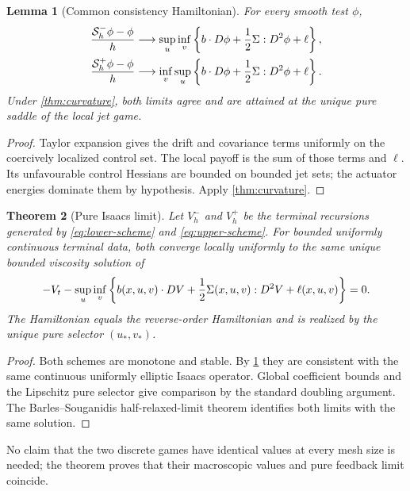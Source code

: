 \documentclass[11pt,reqno]{amsart}
\newtheorem{theorem}{Theorem}[section]
\newtheorem{lemma}[theorem]{Lemma}
\theoremstyle{definition}
\theoremstyle{remark}
\begin{document}
\begin{lemma}[Common consistency Hamiltonian]\label{lem:consistency}
For every smooth test $\phi$,
\begin{align*}
 {\mathcal S_h^-\phi-\phi\over h}&\longrightarrow
 \sup_u\inf_v\left\{
 b\cdot D\phi+{1\over2}\Sigma:D^2\phi+\ell\right\},\\
 {\mathcal S_h^+\phi-\phi\over h}&\longrightarrow
 \inf_v\sup_u\left\{
 b\cdot D\phi+{1\over2}\Sigma:D^2\phi+\ell\right\}.
\end{align*}
Under \cref{thm:curvature}, both limits agree and are attained at the unique
pure saddle of the local jet game.
\end{lemma}

\begin{proof}
Taylor expansion gives the drift and covariance terms uniformly on the
coercively localized control set.  The local payoff is the sum of those terms
and $\ell$.  Its unfavourable control Hessians are bounded on bounded jet sets;
the actuator energies dominate them by hypothesis.  Apply
\cref{thm:curvature}.
\end{proof}

\begin{theorem}[Pure Isaacs limit]\label{thm:scheme}
Let $V_h^-$ and $V_h^+$ be the terminal recursions generated by
\eqref{eq:lower-scheme} and \eqref{eq:upper-scheme}.  For bounded uniformly
continuous terminal data, both converge locally uniformly to the same unique
bounded viscosity solution of
\begin{equation}\label{eq:Isaacs}
 -V_t-\sup_u\inf_v\left\{
 b(x,u,v)\cdot DV+{1\over2}\Sigma(x,u,v):D^2V+\ell(x,u,v)
 \right\}=0.
\end{equation}
The Hamiltonian equals the reverse-order Hamiltonian and is realized by the
unique pure selector $(u_*,v_*)$.
\end{theorem}

\begin{proof}
Both schemes are monotone and stable.  By \cref{lem:consistency} they are
consistent with the same continuous uniformly elliptic Isaacs operator.
Global coefficient bounds and the Lipschitz pure selector give comparison by
the standard doubling argument.  The Barles--Souganidis half-relaxed-limit
theorem identifies both limits with the same solution.
\end{proof}

No claim that the two discrete games have identical values at every mesh size
is needed; the theorem proves that their macroscopic values and pure feedback
limit coincide.
\end{document}
